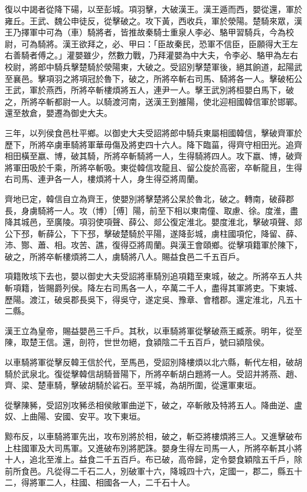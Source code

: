 \begin{pinyinscope}
復以中謁者從降下碭，以至彭城。項羽擊，大破漢王。漢王遁而西，嬰從還，軍於雍丘。王武、魏公申徒反，從擊破之。攻下黃，西收兵，軍於滎陽。楚騎來眾，漢王乃擇軍中可為（車）騎將者，皆推故秦騎士重泉人李必、駱甲習騎兵，今為校尉，可為騎將。漢王欲拜之，必、甲曰：「臣故秦民，恐軍不信臣，臣願得大王左右善騎者傅之。」灌嬰雖少，然數力戰，乃拜灌嬰為中大夫，令李必、駱甲為左右校尉，將郎中騎兵擊楚騎於滎陽東，大破之。受詔別擊楚軍後，絕其餉道，起陽武至襄邑。擊項羽之將項冠於魯下，破之，所將卒斬右司馬、騎將各一人。擊破柘公王武，軍於燕西，所將卒斬樓煩將五人，連尹一人。擊王武別將桓嬰白馬下，破之，所將卒斬都尉一人。以騎渡河南，送漢王到雒陽，使北迎相國韓信軍於邯鄲。還至敖倉，嬰遷為御史大夫。

三年，以列侯食邑杜平鄉。以御史大夫受詔將郎中騎兵東屬相國韓信，擊破齊軍於歷下，所將卒虜車騎將軍華毋傷及將吏四十六人。降下臨菑，得齊守相田光。追齊相田橫至嬴、博，破其騎，所將卒斬騎將一人，生得騎將四人。攻下嬴、博，破齊將軍田吸於千乘，所將卒斬吸。東從韓信攻龍且、留公旋於高密，卒斬龍且，生得右司馬、連尹各一人，樓煩將十人，身生得亞將周蘭。

齊地已定，韓信自立為齊王，使嬰別將擊楚將公杲於魯北，破之。轉南，破薛郡長，身虜騎將一人。攻（博）［傅］陽，前至下相以東南僮、取慮、徐。度淮，盡降其城邑，至廣陵。項羽使項聲、薛公、郯公復定淮北。嬰度淮北，擊破項聲、郯公下邳，斬薛公，下下邳，擊破楚騎於平陽，遂降彭城，虜柱國項佗，降留、薛、沛、酂、蕭、相。攻苦、譙，復得亞將周蘭。與漢王會頤鄉。從擊項籍軍於陳下，破之，所將卒斬樓煩將二人，虜騎將八人。賜益食邑二千五百戶。

項籍敗垓下去也，嬰以御史大夫受詔將車騎別追項籍至東城，破之。所將卒五人共斬項籍，皆賜爵列侯。降左右司馬各一人，卒萬二千人，盡得其軍將吏。下東城、歷陽。渡江，破吳郡長吳下，得吳守，遂定吳、豫章、會稽郡。還定淮北，凡五十二縣。

漢王立為皇帝，賜益嬰邑三千戶。其秋，以車騎將軍從擊破燕王臧荼。明年，從至陳，取楚王信。還，剖符，世世勿絕，食潁陰二千五百戶，號曰潁陰侯。

以車騎將軍從擊反韓王信於代，至馬邑，受詔別降樓煩以北六縣，斬代左相，破胡騎於武泉北。復從擊韓信胡騎晉陽下，所將卒斬胡白題將一人。受詔并將燕、趙、齊、梁、楚車騎，擊破胡騎於硰石。至平城，為胡所圍，從還軍東垣。

從擊陳豨，受詔別攻豨丞相侯敞軍曲逆下，破之，卒斬敞及特將五人。降曲逆、盧奴、上曲陽、安國、安平。攻下東垣。

黥布反，以車騎將軍先出，攻布別將於相，破之，斬亞將樓煩將三人。又進擊破布上柱國軍及大司馬軍。又進破布別將肥誅。嬰身生得左司馬一人，所將卒斬其小將十人，追北至淮上。益食二千五百戶。布已破，高帝歸，定令嬰食穎陰五千戶，除前所食邑。凡從得二千石二人，別破軍十六，降城四十六，定國一，郡二，縣五十二，得將軍二人，柱國、相國各一人，二千石十人。


\end{pinyinscope}
